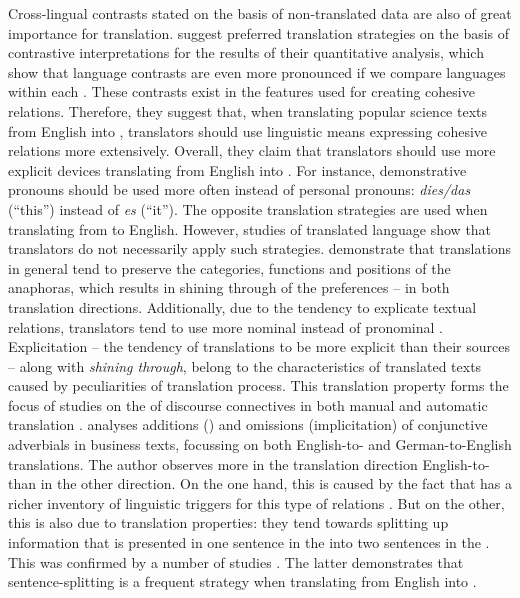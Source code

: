 \documentclass[output=paper]{langsci/langscibook.cls}
\begin{document}
Cross-lingual contrasts stated on the basis of non-translated data are also of great importance for translation. \citet{SleGeccoForthcoming} suggest preferred translation strategies on the basis of contrastive interpretations for the results of their quantitative analysis, which show that language contrasts are even more pronounced if we compare languages within each . These contrasts exist in the features used for creating cohesive relations. Therefore, they suggest that, when translating popular science texts from English into , translators should use linguistic means expressing cohesive relations more extensively. Overall, they claim that translators should use more explicit devices translating from English into . For instance, demonstrative pronouns should be used more often instead of personal pronouns:  \textsl{dies/das} (``this'') instead of  \textsl{es} (``it''). The opposite translation strategies are used when translating from  to English.
\largerpage
However, studies of translated language show that translators do not necessarily apply such strategies.  \citet{ZinsmeisterEtAl2012} demonstrate that translations in general tend to preserve the categories, functions and positions of the  anaphoras, which results in {\sc shining through} of the  preferences \citep{Teich2003} -- in both translation directions. Additionally, due to the tendency to explicate textual relations, translators tend to use more nominal  instead of pronominal . {\sc Explicitation} -- the tendency of translations to be more explicit than their sources \citep{VinayDarbelnet58,BlumKulka1986} -- along with  \textsl{shining through}, belong to the characteristics of translated texts caused by peculiarities of translation process. This translation property forms the focus of studies on the  of discourse connectives in both manual and automatic translation \citep[see][]{Becher2011,Bisiada2014,MeyerWebber2013,LiEtAl2014COLING}. %
\citet{Becher2011} analyses additions () and omissions ({\sc implicitation}) of conjunctive adverbials in business texts, focussing on both English-to- and German-to-English translations. The author observes more  in the translation direction English-to- than in the other direction. On the one hand, this is caused by the fact that  has a richer inventory of linguistic triggers for this type of relations \citep[see][]{Becher2011,KunzLapshinova2014}. But on the other, this is also due to translation properties: they tend towards splitting up information that is presented in one sentence in the
 into two sentences in the . This was confirmed by a number of studies \citep[such as][]{fabricius1999information,Doherty2004,Bisiada2014}. The latter demonstrates that sentence-splitting is a frequent strategy when translating from English into . 
\end{document}
